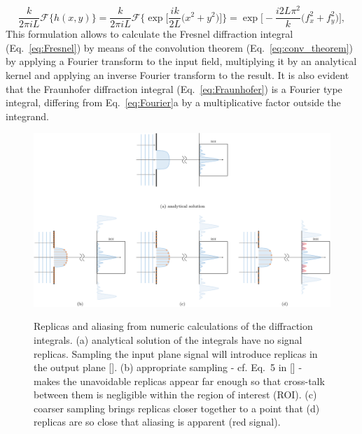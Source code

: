 \begin{refsection}
\begin{equation}\label{eq:kernel}
     \frac{k}{2\pi i L}\mathcal{F}\{h(x,y)\} = \frac{k}{2\pi i L}\mathcal{F}\Bigg\{
    \exp\bigg[\frac{ik}{2L}\big(x^2+y^2 \big)\bigg]\Bigg\} = \exp{\bigg[-\frac{i2L\pi^2}{k} \big(f_x^2+f_y^2 \big)\bigg]},
\end{equation}
This formulation allows to calculate the Fresnel diffraction integral (Eq.~\ref{eq:Fresnel}) by means of the convolution theorem (Eq.~\ref{eq:conv_theorem}) by applying a Fourier transform to the input field, multiplying it by an analytical kernel and applying an inverse Fourier transform to the result. It is also evident that the Fraunhofer diffraction integral (Eq.~\ref{eq:Fraunhofer}) is a Fourier type integral, differing from Eq.~\ref{eq:Fourier}a by a multiplicative factor outside the integrand. 

\begin{figure}[t]
    \centering
    {\includegraphics[width=1\linewidth]{figures/ch02/sampling_aliasing.pdf}}
    \caption[Replicas and aliasing]{Replicas and aliasing from numeric calculations of the diffraction integrals. (a) analytical solution of the integrals have no signal replicas. Sampling the input plane signal will introduce replicas in the output plane [\cite{Kelly2014}]. (b) appropriate sampling - cf. Eq.~5 in [\cite{Chubar2019}] - makes the unavoidable replicas appear far enough so that cross-talk between them is negligible within the region of interest (ROI). (c) coarser sampling brings replicas closer together to a point that (d) replicas are so close that aliasing is apparent (red signal).}
    \label{fig:sampling}
\end{figure}


\end{refsection}
